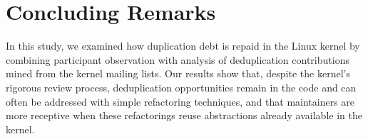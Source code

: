 \documentclass[10pt,conference]{IEEEtran}
\begin{document}

	
\section{Concluding Remarks}\label{sec:conclusion}

In this study, we examined how duplication debt is repaid in the Linux kernel by combining participant observation with analysis of deduplication contributions mined from the kernel mailing lists.
Our results show that, despite the kernel's rigorous review process, deduplication opportunities remain in the code and can often be addressed with simple refactoring techniques, and that maintainers are more receptive when these refactorings reuse abstractions already available in the kernel.
\end{document}
